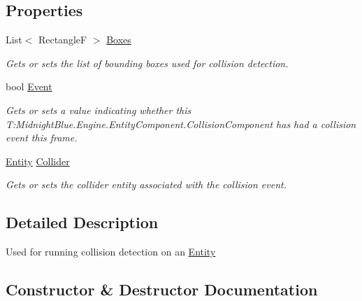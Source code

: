 \subsection*{Properties}
\begin{DoxyCompactItemize}
\item 
List$<$ RectangleF $>$ \hyperlink{class_midnight_blue_1_1_engine_1_1_entity_component_1_1_collision_component_a013ef17544e90c756f0f34fe7d10232a}{Boxes}
\begin{DoxyCompactList}\small\item\em Gets or sets the list of bounding boxes used for collision detection. \end{DoxyCompactList}\item 
bool \hyperlink{class_midnight_blue_1_1_engine_1_1_entity_component_1_1_collision_component_a7eb74261b13d9d7fda8568886316c087}{Event}
\begin{DoxyCompactList}\small\item\em Gets or sets a value indicating whether this T\+:\+Midnight\+Blue.\+Engine.\+Entity\+Component.\+Collision\+Component has had a collision event this frame. \end{DoxyCompactList}\item 
\hyperlink{class_midnight_blue_1_1_engine_1_1_entity_component_1_1_entity}{Entity} \hyperlink{class_midnight_blue_1_1_engine_1_1_entity_component_1_1_collision_component_a02a5ffafd3739b8e1a822f471938951a}{Collider}
\begin{DoxyCompactList}\small\item\em Gets or sets the collider entity associated with the collision event. \end{DoxyCompactList}\end{DoxyCompactItemize}


\subsection{Detailed Description}
Used for running collision detection on an \hyperlink{class_midnight_blue_1_1_engine_1_1_entity_component_1_1_entity}{Entity} 



\subsection{Constructor \& Destructor Documentation}
\hypertarget{class_midnight_blue_1_1_engine_1_1_entity_component_1_1_collision_component_afb80f636b6d414c1ec2bba6b410dafc4}{}\label{class_midnight_blue_1_1_engine_1_1_entity_component_1_1_collision_component_afb80f636b6d414c1ec2bba6b410dafc4} 
